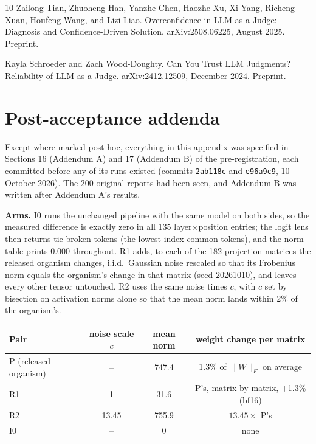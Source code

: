 \documentclass{article}
\begin{document}
\begin{thebibliography}{10}
Zailong Tian, Zhuoheng Han, Yanzhe Chen, Haozhe Xu, Xi Yang, Richeng Xuan, Houfeng Wang, and Lizi Liao.
\newblock Overconfidence in LLM-as-a-Judge: Diagnosis and Confidence-Driven Solution.
\newblock arXiv:2508.06225, August 2025. Preprint.

Kayla Schroeder and Zach Wood-Doughty.
\newblock Can You Trust LLM Judgments? Reliability of LLM-as-a-Judge.
\newblock arXiv:2412.12509, December 2024. Preprint.

\end{thebibliography}

\clearpage
\appendix

\section{Post-acceptance addenda}
\label{app:addendum}

Except where marked post hoc, everything in this appendix was specified in
Sections 16 (Addendum A) and 17 (Addendum B) of the pre-registration, each
committed before any of its runs existed (commits \texttt{2ab118c} and
\texttt{e96a9c9}, 10 October 2026). The 200 original reports had been seen, and
Addendum B was written after Addendum A's results.

\textbf{Arms.} I0 runs the unchanged pipeline with the same model on both sides,
so the measured difference is exactly zero in all 135 layer$\times$position
entries; the logit lens then returns tie-broken tokens (the lowest-index common
tokens), and the norm table prints 0.000 throughout. R1 adds, to each of the 182
projection matrices the released organism changes, i.i.d.\ Gaussian noise
rescaled so that its Frobenius norm equals the organism's change in that matrix
(seed 20261010), and leaves every other tensor untouched. R2 uses the same noise
times $c$, with $c$ set by bisection on activation norms alone so that the mean
norm lands within 2\% of the organism's.

\begin{center}\footnotesize
\begin{tabular}{@{}lccc@{}}
\toprule
Pair & noise scale $c$ & mean norm & weight change per matrix\\
\midrule
P (released organism) & -- & 747.4 & 1.3\% of $\|W\|_F$ on average\\
R1 & 1 & 31.6 & P's, matrix by matrix, $+$1.3\% (bf16)\\
R2 & 13.45 & 755.9 & $13.45\times$ P's\\
I0 & -- & 0 & none\\
\bottomrule
\end{tabular}
\end{center}
\end{document}
